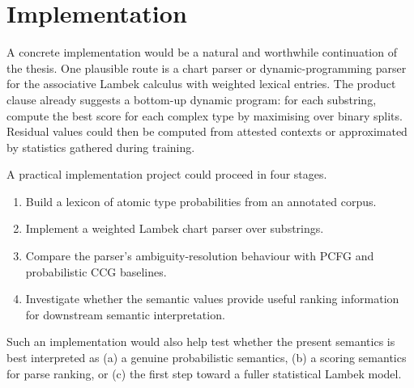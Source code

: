 \section{Implementation}
A concrete implementation would be a natural and worthwhile continuation of the thesis.
One plausible route is a chart parser or dynamic-programming parser for the associative Lambek
calculus with weighted lexical entries. The product clause already suggests a bottom-up dynamic
program: for each substring, compute the best score for each complex type by maximising over
binary splits. Residual values could then be computed from attested contexts or approximated by
statistics gathered during training.

A practical implementation project could proceed in four stages.
\begin{enumerate}[label=(\arabic*)]
    \item Build a lexicon of atomic type probabilities from an annotated corpus.
    \item Implement a weighted Lambek chart parser over substrings.
    \item Compare the parser's ambiguity-resolution behaviour with PCFG and probabilistic CCG
    baselines.
    \item Investigate whether the semantic values provide useful ranking information for downstream
    semantic interpretation.
\end{enumerate}

Such an implementation would also help test whether the present semantics is best interpreted as
(a) a genuine probabilistic semantics, (b) a scoring semantics for parse ranking, or (c) the first
step toward a fuller statistical Lambek model.

